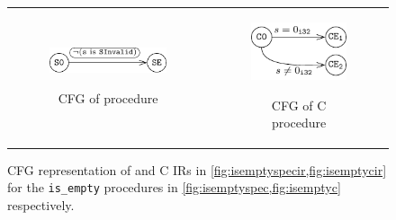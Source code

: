 \begin{figure}
\begin{tabular}{@{}c@{}c@{}}
\begin{subfigure}[b]{0.5\textwidth}
\begin{center}
{\includegraphics[scale=1.4]{chapters/figures/figIsEmptySpecCFG.pdf}}
\end{center}
\vspace{20px}
\caption{\label{fig:isemptyspeccfg}CFG of \SpecL{} procedure}
\end{subfigure}%
&
\begin{subfigure}[b]{0.5\textwidth}
\begin{center}
{\includegraphics[scale=1.4]{chapters/figures/figIsEmptyCCFG.pdf}}
\end{center}
\caption{\label{fig:isemptyccfg}CFG of C procedure}
\end{subfigure}%
\\
\end{tabular}
\caption{\label{fig:isemptyspecandccfg}CFG representation of \SpecL{} and C IRs in \cref{fig:isemptyspecir,fig:isemptycir} for the {\tt is\_empty} procedures in \cref{fig:isemptyspec,fig:isemptyc} respectively.}
\end{figure}
